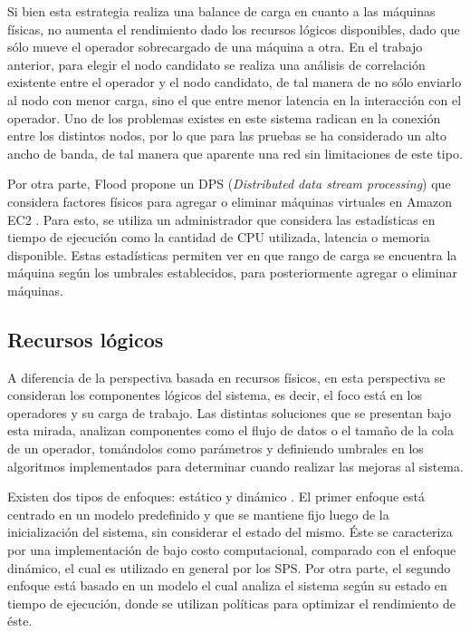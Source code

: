 Si bien esta estrategia realiza una balance de carga en cuanto a las máquinas físicas, no aumenta el rendimiento dado los recursos lógicos disponibles, dado que sólo mueve el operador sobrecargado de una máquina a otra. En el trabajo anterior, para elegir el nodo candidato se realiza una análisis de correlación existente entre el operador y el nodo candidato, de tal manera de no sólo enviarlo al nodo con menor carga, sino el que entre menor latencia en la interacción con el operador. Uno de los problemas existes en este sistema radican en la conexión entre los distintos nodos, por lo que para las pruebas se ha considerado un alto ancho de banda, de tal manera que aparente una red sin limitaciones de este tipo.

Por otra parte, Flood \citep{Alves2010flood} propone un DPS (\textit{Distributed data stream processing}) que considera factores físicos para agregar o eliminar máquinas virtuales en Amazon EC2 \citep{amazonec2}. Para esto, se utiliza un administrador que considera las estadísticas en tiempo de ejecución como la cantidad de CPU utilizada, latencia o memoria disponible. Estas estadísticas permiten ver en que rango de carga se encuentra la máquina según los umbrales establecidos, para posteriormente agregar o eliminar máquinas.

\subsection{Recursos lógicos}
\label{subsec:recLogicosBC}

A diferencia de la perspectiva basada en recursos físicos, en esta perspectiva se consideran los componentes lógicos del sistema, es decir, el foco está en los operadores y su carga de trabajo. Las distintas soluciones que se presentan bajo esta mirada, analizan componentes como el flujo de datos o el tamaño de la cola de un operador, tomándolos como parámetros y definiendo umbrales en los algoritmos implementados para determinar cuando realizar las mejoras al sistema.


Existen dos tipos de enfoques: estático y dinámico \citep{Gupta99loadsharing}. El primer enfoque está centrado en un modelo predefinido y que se mantiene fijo luego de la inicialización del sistema, sin considerar el estado del mismo. \normalsize{Éste se caracteriza por una implementación de bajo costo computacional, comparado con el enfoque dinámico, el cual es utilizado en general por los SPS. Por otra parte, el segundo enfoque está basado en un modelo el cual analiza el sistema según su estado en tiempo de ejecución, donde se utilizan políticas para optimizar el rendimiento de éste.}

